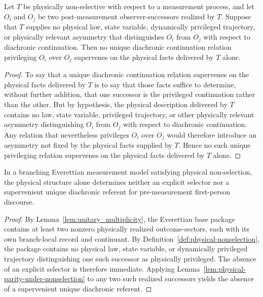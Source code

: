 \begin{lemma}
\label{lem:physical-parity-under-nonselection}
Let $T$ be physically non-selective with respect to a measurement process, and let $O_i$ and $O_j$
be two post-measurement observer-successors realized by $T$. Suppose that $T$ supplies no physical
law, state variable, dynamically privileged trajectory, or physically relevant asymmetry that distinguishes
$O_i$ from $O_j$ with respect to diachronic continuation. Then no unique diachronic continuation
relation privileging $O_i$ over $O_j$ supervenes on the physical facts delivered by $T$ alone.
\end{lemma}

\begin{proof}
To say that a unique diachronic continuation relation supervenes on the physical facts delivered by $T$
is to say that those facts suffice to determine, without further addition, that one successor is the
privileged continuation rather than the other. But by hypothesis, the physical description delivered by
$T$ contains no law, state variable, privileged trajectory, or other physically relevant asymmetry
distinguishing $O_i$ from $O_j$ with respect to diachronic continuation. Any relation that nevertheless
privileges $O_i$ over $O_j$ would therefore introduce an asymmetry not fixed by the physical facts
supplied by $T$. Hence no such unique privileging relation supervenes on the physical facts delivered
by $T$ alone.
\end{proof}

\begin{corollary}
\label{cor:everettian-nonselection}
\label{prop:no_selector_base}
In a branching Everettian measurement model satisfying physical non-selection, the physical structure
alone determines neither an explicit selector nor a supervenient unique diachronic referent for
pre-measurement first-person discourse.
\end{corollary}

\begin{proof}
By Lemma~\ref{lem:unitary_multiplicity}, the Everettian base package contains at least two nonzero
physically realized outcome-sectors, each with its own branch-local record and continuant. By
Definition~\ref{def:physical-nonselection}, the package contains no physical law, state variable, or
dynamically privileged trajectory distinguishing one such successor as physically privileged. The
absence of an explicit selector is therefore immediate. Applying Lemma~\ref{lem:physical-parity-under-nonselection}
to any two such realized successors yields the absence of a supervenient unique diachronic referent.
\end{proof}

